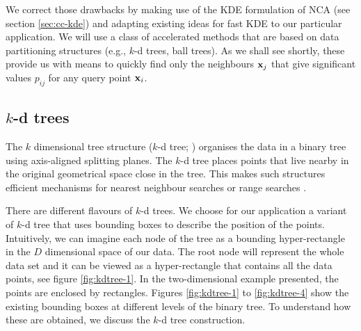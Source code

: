 We correct those drawbacks by making use of the KDE formulation of NCA (see
section \ref{sec:cc-kde}) and adapting existing ideas for fast KDE
\citep{deng1995,gray2003} to our particular application. We will use a class of
accelerated methods that are based on data partitioning structures
(e.g., $k$-d trees, ball trees). As we shall see shortly, these provide
us with means to quickly find only the neighbours $\mathbf{x}_j$ that give significant
values $p_{ij}$ for any query point $\mathbf{x}_i$. 
%

\subsection{$k$-d trees}
\label{subsec:k-d-trees}

The $k$ dimensional tree structure ($k$-d tree; \citealp{bentley1975}) organises
the data in a binary tree using axis-aligned splitting planes. The $k$-d tree
places points that live nearby in the 
original geometrical space close in the tree. This makes such structures efficient mechanisms for
nearest neighbour searches \citep{friedman1977} or range searches
\citep{moore1991}.

There are different flavours of $k$-d trees. We choose for our application a
variant of $k$-d tree that uses bounding boxes to describe the position of the
points. Intuitively, we can imagine each node of the tree as a bounding
hyper-rectangle in the $D$ dimensional space of our data. The root node will
represent the whole data set and it can be viewed as a hyper-rectangle that
contains all the data points, see figure \ref{fig:kdtree-1}. In the two-dimensional example presented, the points are enclosed by rectangles. Figures \ref{fig:kdtree-1} to \ref{fig:kdtree-4} show the existing bounding boxes at different levels of the binary tree. To understand how these are obtained, we discuss the $k$-d tree construction.

